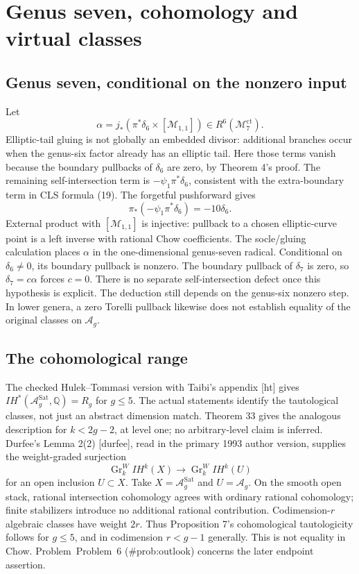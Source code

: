 \documentclass[10pt]{article}
\begin{document}
\section*{Genus seven, cohomology and virtual classes}
\subsection*{Genus seven, conditional on the nonzero input}
Let \[\alpha=j_*(\pi^*\delta_6\times[\mathcal M_{1,1}])\in R^6(\mathcal M_7^\mathrm{ct}).\] Elliptic-tail gluing is not globally an embedded divisor: additional branches occur when the genus-six factor already has an elliptic tail. Here those terms vanish because the boundary pullbacks of \(\delta_6\) are zero, by Theorem 4’s proof. The remaining self-intersection term is \(-\psi_1\pi^*\delta_6\), consistent with the extra-boundary term in CLS formula (19). The forgetful pushforward gives \[\pi_*(-\psi_1\pi^*\delta_6)=-10\delta_6.\] External product with \([\mathcal M_{1,1}]\) is injective: pullback to a chosen elliptic-curve point is a left inverse with rational Chow coefficients. The socle/gluing calculation places \(\alpha\) in the one-dimensional genus-seven radical. Conditional on \(\delta_6\ne0\), its boundary pullback is nonzero. The boundary pullback of \(\delta_7\) is zero, so \(\delta_7=c\alpha\) forces \(c=0\). There is no separate self-intersection defect once this hypothesis is explicit. The deduction still depends on the genus-six nonzero step. In lower genera, a zero Torelli pullback likewise does not establish equality of the original classes on \(\mathcal A_g\).\par
\subsection*{The cohomological range}
The checked Hulek–Tommasi version with Taibi’s appendix [ht] gives \(IH^*(\mathcal A_g^{\mathrm{Sat}},\mathbb Q)=R_g\) for \(g\le5\). The actual statements identify the tautological classes, not just an abstract dimension match. Theorem 33 gives the analogous description for \(k<2g-2\), at level one; no arbitrary-level claim is inferred. Durfee’s Lemma 2(2) [durfee], read in the primary 1993 author version, supplies the weight-graded surjection \[\operatorname{Gr}^W_kIH^k(X)\longrightarrow
                       \operatorname{Gr}^W_kIH^k(U)\] for an open inclusion \(U\subset X\). Take \(X=\mathcal A_g^{\mathrm{Sat}}\) and \(U=\mathcal A_g\). On the smooth open stack, rational intersection cohomology agrees with ordinary rational cohomology; finite stabilizers introduce no additional rational contribution. Codimension-\(r\) algebraic classes have weight \(2r\). Thus Proposition 7’s cohomological tautologicity follows for \(g\le5\), and in codimension \(r<g-1\) generally. This is not equality in Chow. Problem Problem 6 (\#prob:outlook) concerns the later endpoint assertion.\par
\end{document}
